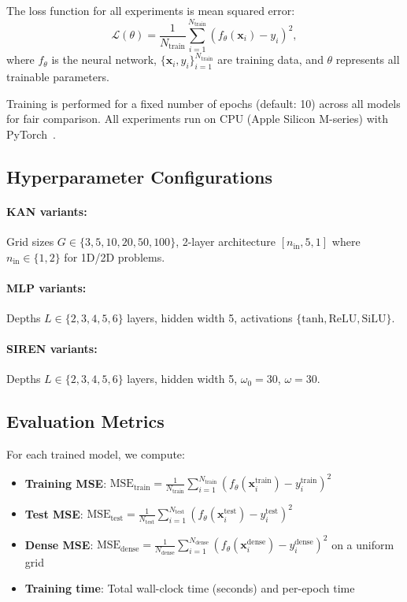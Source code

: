 \documentclass[11pt,a4paper]{article}
\begin{document}
The loss function for all experiments is mean squared error:
\begin{equation}
\mathcal{L}(\theta) = \frac{1}{N_{\text{train}}} \sum_{i=1}^{N_{\text{train}}} \left(f_\theta(\mathbf{x}_i) - y_i\right)^2,
\end{equation}
where $f_\theta$ is the neural network, $\{\mathbf{x}_i, y_i\}_{i=1}^{N_{\text{train}}}$ are training data, and $\theta$ represents all trainable parameters.

Training is performed for a fixed number of epochs (default: 10) across all models for fair comparison. All experiments run on CPU (Apple Silicon M-series) with PyTorch~\citep{kingma2015adam}.

\subsection{Hyperparameter Configurations}

\paragraph{KAN variants:} Grid sizes $G \in \{3, 5, 10, 20, 50, 100\}$, 2-layer architecture $[n_{\text{in}}, 5, 1]$ where $n_{\text{in}} \in \{1,2\}$ for 1D/2D problems.

\paragraph{MLP variants:} Depths $L \in \{2, 3, 4, 5, 6\}$ layers, hidden width 5, activations $\{\text{tanh}, \text{ReLU}, \text{SiLU}\}$.

\paragraph{SIREN variants:} Depths $L \in \{2, 3, 4, 5, 6\}$ layers, hidden width 5, $\omega_0 = 30$, $\omega = 30$.

\subsection{Evaluation Metrics}

For each trained model, we compute:
\begin{itemize}
    \item \textbf{Training MSE}: $\text{MSE}_{\text{train}} = \frac{1}{N_{\text{train}}} \sum_{i=1}^{N_{\text{train}}} (f_\theta(\mathbf{x}_i^{\text{train}}) - y_i^{\text{train}})^2$
    \item \textbf{Test MSE}: $\text{MSE}_{\text{test}} = \frac{1}{N_{\text{test}}} \sum_{i=1}^{N_{\text{test}}} (f_\theta(\mathbf{x}_i^{\text{test}}) - y_i^{\text{test}})^2$
    \item \textbf{Dense MSE}: $\text{MSE}_{\text{dense}} = \frac{1}{N_{\text{dense}}} \sum_{i=1}^{N_{\text{dense}}} (f_\theta(\mathbf{x}_i^{\text{dense}}) - y_i^{\text{dense}})^2$ on a uniform grid
    \item \textbf{Training time}: Total wall-clock time (seconds) and per-epoch time
\end{itemize}
\end{document}
